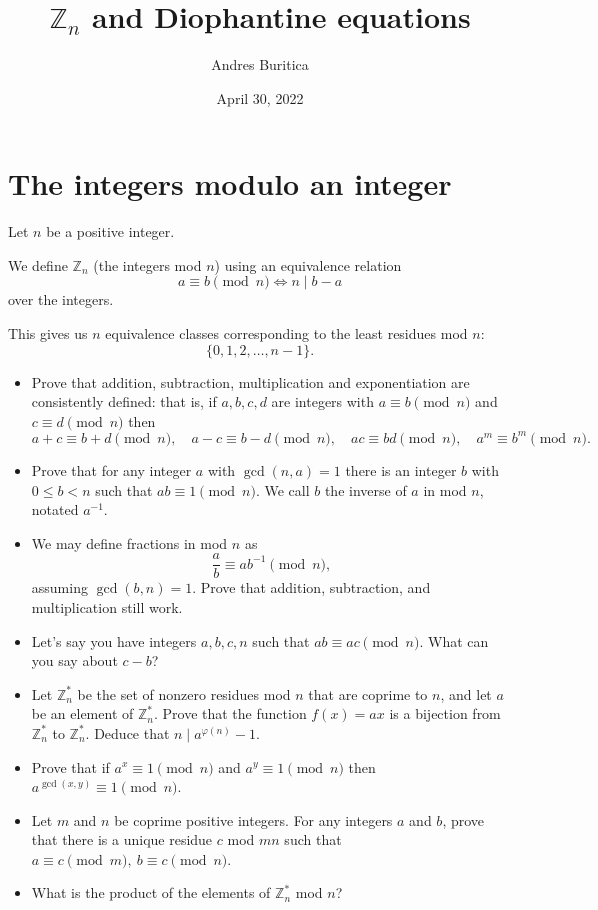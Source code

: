 \documentclass{article}
\title{$\mathbb Z_n$ and Diophantine equations}
\author{Andres Buritica}
\date{April 30, 2022}
\begin{document}
\maketitle
\section{The integers modulo an integer}
  Let $n$ be a positive integer.

  We define $\mathbb Z_n$ (the integers mod $n$) using an equivalence relation
  \[a\equiv b\pmod n\iff n\mid b-a\]
  over the integers.

  This gives us $n$ equivalence classes corresponding to the least residues mod
  $n$: \[\{0,1,2,\ldots,n-1\}.\]
  \begin{itemize}
    \item Prove that addition, subtraction, multiplication and exponentiation
      are consistently defined: that
      is, if $a,b,c,d$ are integers with $a\equiv b\pmod n$ and $c\equiv d\pmod
      n$ then \[a+c\equiv b+d\pmod n,\quad a-c\equiv b-d\pmod n,\quad ac\equiv
        bd\pmod n,\quad a^m\equiv b^m\pmod n.\]
    \item Prove that for any integer $a$ with $\gcd(n,a)=1$ there is an integer $b$
      with $0\le b<n$ such that $ab\equiv 1\pmod n$. We call $b$ the inverse of
      $a$ in mod $n$, notated $a^{-1}$.
    \item We may define fractions in mod $n$ as \[\frac ab\equiv ab^{-1}\pmod n,\]
      assuming $\gcd(b,n)=1$. Prove that addition, subtraction, and
      multiplication still work.
    \item Let's say you have integers $a,b,c,n$ such that $ab\equiv ac\pmod n$.
      What can you say about $c-b$?
    \item Let $\mathbb Z_n^*$ be the set of nonzero residues mod $n$ that are
      coprime to $n$, and let $a$ be an
      element of $\mathbb Z_n^*$. Prove that the function $f(x)=ax$ is a
      bijection from $\mathbb Z_n^*$ to $\mathbb Z_n^*$. Deduce that $n\mid
      a^{\varphi(n)}-1$.
    \item Prove that if $a^x\equiv 1\pmod n$ and $a^y\equiv 1\pmod n$ then
      $a^{\gcd(x,y)}\equiv 1\pmod n$.
    \item Let $m$ and $n$ be coprime positive integers. For any integers $a$ and
      $b$, prove that there is a unique residue $c$ mod $mn$ such that $a\equiv
      c\pmod m,\ b\equiv c\pmod n$.
    \item What is the product of the elements of $\mathbb Z_n^*$ mod $n$?
  \end{itemize}
  \newpage
\end{document}
